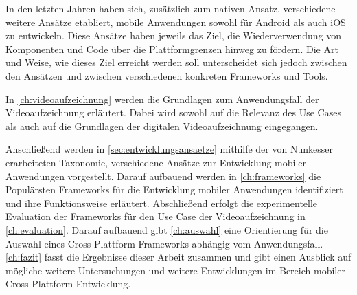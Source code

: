 In den letzten Jahren haben sich, zusätzlich zum nativen Ansatz, verschiedene weitere Ansätze etabliert, mobile Anwendungen sowohl für Android als auch iOS zu entwickeln.
Diese Ansätze haben jeweils das Ziel, die Wiederverwendung von Komponenten und Code über die Plattformgrenzen hinweg zu fördern.
Die Art und Weise, wie dieses Ziel erreicht werden soll unterscheidet sich jedoch zwischen den Ansätzen und zwischen verschiedenen konkreten Frameworks und Tools.

In \autoref{ch:videoaufzeichnung} werden die Grundlagen zum Anwendungsfall der Videoaufzeichnung erläutert.
Dabei wird sowohl auf die Relevanz des Use Cases als auch auf die Grundlagen der digitalen Videoaufzeichnung eingegangen.




Anschließend werden in \autoref{sec:entwicklungsansaetze} mithilfe der von Nunkesser \cite{Nunkesser_Taxonomy_Apps} erarbeiteten Taxonomie, verschiedene Ansätze zur Entwicklung mobiler Anwendungen vorgestellt.
Darauf aufbauend werden in \autoref{ch:frameworks} die Populärsten Frameworks für die Entwicklung mobiler Anwendungen identifiziert und ihre Funktionsweise erläutert.
Abschließend erfolgt die experimentelle Evaluation der Frameworks für den Use Case der Videoaufzeichnung in \autoref{ch:evaluation}.
Darauf aufbauend gibt \autoref{ch:auswahl} eine Orientierung für die Auswahl eines Cross-Plattform Frameworks abhängig vom Anwendungsfall.
\autoref{ch:fazit} fasst die Ergebnisse dieser Arbeit zusammen und gibt einen Ausblick auf mögliche weitere Untersuchungen und weitere Entwicklungen im Bereich mobiler Cross-Plattform Entwicklung.
